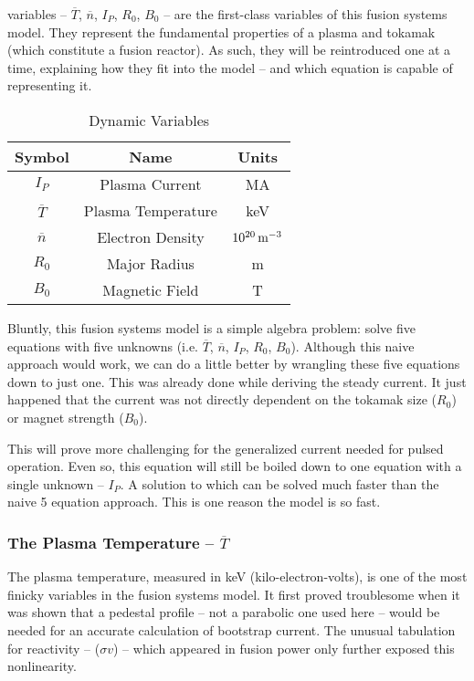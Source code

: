  variables -- $\overline T$, $\overline n$, $I_P$, $R_0$, $B_0$ -- are the first-class variables of this fusion systems model. They represent the fundamental properties of a plasma and tokamak (which constitute a fusion reactor). As such, they will be reintroduced one at a time, explaining how they fit into the model -- and which equation is capable of representing it.

\begin{table}[h!]
\centering	
\caption{Dynamic Variables}
\begin{tabular}{ c|c|c } 

\textbf{Symbol} & \textbf{Name} & \textbf{Units} \\
\hline
$I_P$ & Plasma Current & MA \\ 
$\overline{T}$ & Plasma Temperature & keV \\ 
$\overline{n}$ & Electron Density & $10^{20} \, \textnormal{m}^{-3}$ \\ 
$R_0$ &  Major Radius & m \\ 
$B_0$ &  Magnetic Field & T
\end{tabular}
\label{table:dynamic}
\end{table}

Bluntly, this fusion systems model is a simple algebra problem: solve five equations with five unknowns (i.e. $\overline T$, $\overline n$, $I_P$, $R_0$, $B_0$). Although this naive approach would work, we can do a little better by wrangling these five equations down to just one. This was already done while deriving the steady current. It just happened that the current was not directly dependent on the tokamak size ($R_0$) or magnet strength ($B_0$). 

This will prove more challenging for the generalized current needed for pulsed operation. Even so, this equation will still be boiled down to one equation with a single unknown -- $I_P$. A solution to which can be solved much faster than the naive 5 equation approach. This is one reason the model is so fast. 

\subsubsection{The Plasma Temperature -- $\overline T$}

The plasma temperature, measured in keV (kilo-electron-volts), is one of the most finicky variables in the fusion systems model. It first proved troublesome when it was shown that a pedestal profile -- not a parabolic one used here -- would be needed for an accurate calculation of bootstrap current. The unusual tabulation for reactivity -- ($\sigma v$) -- which appeared in fusion power only further exposed this nonlinearity.

